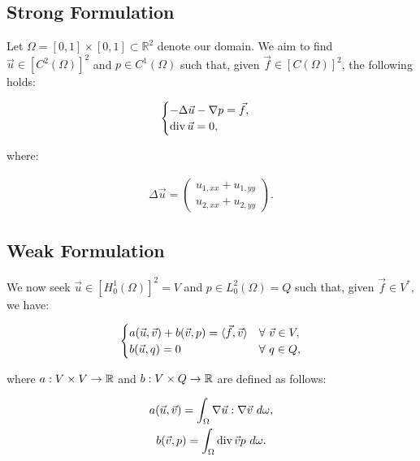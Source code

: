 \subsection{Strong Formulation}

Let $\Omega = [0, 1] \times [0, 1] \subset \mathbb{R}^2$ denote our domain. We aim to find $\vec{u} \in [C^2(\Omega)]^2$ and $p \in C^1(\Omega)$ such that, given $\vec{f} \in [C(\Omega)]^2$, the following holds:

\begin{gather}
    \begin{cases} \label{strong_stokes}
        - \Delta \vec{u} - \nabla p = \vec{f}, \\
        \operatorname{div} \vec{u} = 0,
    \end{cases}
\end{gather}

where:

\begin{gather}
    \Delta \vec{u} = \begin{pmatrix}
        u_{1, xx} + u_{1, yy} \\
        u_{2, xx} + u_{2, yy}
    \end{pmatrix} .
\end{gather}

\subsection{Weak Formulation}

We now seek $\vec{u} \in [H^1_0(\Omega)]^2 = V$ and $p \in L^2_0(\Omega) = Q$ such that, given $\vec{f} \in V^*$, we have:

\begin{gather} \label{weak_stokes}
    \begin{cases}
        a(\vec{u}, \vec{v}) + b(\vec{v}, p) = \langle \vec{f}, \vec{v} \rangle & \forall ~ \vec{v} \in V,\\
        b(\vec{u}, q) = 0 & \forall ~ q \in Q,
    \end{cases}
\end{gather}

where $a: V \times V \rightarrow \mathbb{R}$ and $b: V \times Q \rightarrow \mathbb{R}$ are defined as follows:

\begin{gather}
    a(\vec{u}, \vec{v}) = \int_{\Omega} \nabla \vec{u} : \nabla \vec{v} ~ d \omega, \\
    b(\vec{v}, p) = \int_{\Omega} \operatorname{div} \vec{v} p ~ d \omega.
\end{gather}

